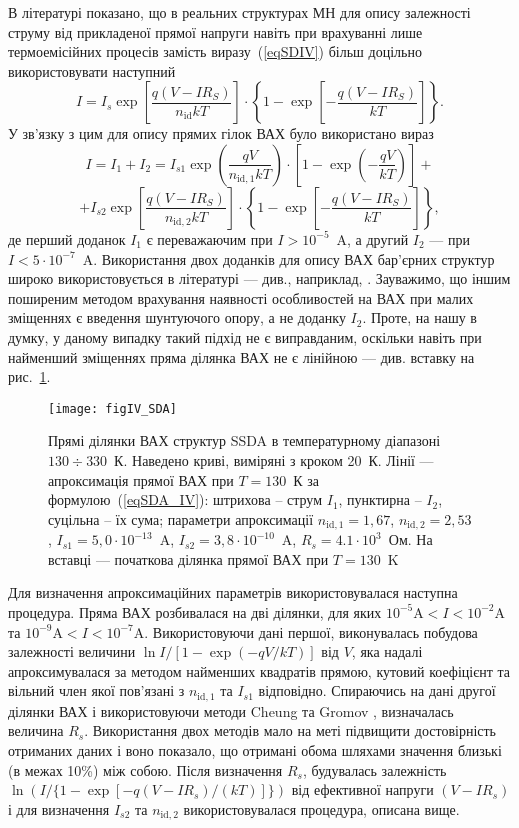 В літературі \cite{Rhoderick1988,Gromov,Sze2012} показано, що в реальних структурах МН для опису залежності струму від прикладеної прямої напруги
навіть при врахуванні лише термоемісійних процесів замість виразу~(\ref{eqSDIV}) більш доцільно використовувати наступний
\begin{equation}
\label{eqSDIV:2}
I=I_s\exp\left[\frac{q(V-IR_S)}{n_\mathrm{id}kT}\right]\cdot
\left\{1-\exp\left[-\frac{q(V-IR_S)}{kT}\right]\right\}.
\end{equation}
У зв'язку з цим для опису прямих гілок ВАХ було використано вираз
\[
I=I_1+I_2=I_{s1}\exp{\left(\frac{qV}{n_{\mathrm{id},1}kT}\right)}\cdot
\left[1-\exp{\left(-\frac{qV}{kT}\right)}\right]+\]
\begin{equation} \label{eqSDA_IV}
+I_{s2}\exp\left[\frac{q(V-IR_S)}{n_{\mathrm{id},2}kT}\right]\cdot
\left\{1-\exp\left[-\frac{q(V-IR_S)}{kT}\right]\right\},
\end{equation}
де перший доданок $I_1$ є переважаючим при $I>10^{-5}$~A, а другий $I_2$ --- при $I<5\cdot10^{-7}$~A.
Використання двох доданків для опису ВАХ бар'єрних структур широко використовується
в літературі --- див., наприклад, \cite{Arslan,Donoval2010,Huang,GELCZUK2014}.
Зауважимо, що іншим поширеним методом врахування наявності особливостей на ВАХ при малих зміщеннях є введення шунтуючого опору, а не доданку $I_2$.
Проте, на нашу в думку, у даному випадку такий підхід не є виправданим, оскільки навіть при найменший зміщеннях пряма ділянка ВАХ не є лінійною --- див. вставку на рис.~\ref{figIV_SDA}.

\begin{figure}
\center
\texttt{[image: figIV\_SDA]}
\caption{\label{figIV_SDA}
Прямі  ділянки ВАХ структур SSDA в температурному діапазоні $130\div330$~К.
Наведено криві, виміряні з кроком 20~К.
Лінії --- апроксимація прямої ВАХ при $T=130$~К за формулою~(\ref{eqSDA_IV}):
штрихова -- струм $I_1$, пунктирна -- $I_2$,
суцільна -- їх сума;
параметри апроксимації $n_{\mathrm{id},1}=1,67$,
$n_{\mathrm{id},2}=2,53$,
$I_{s1}=5,0\cdot10^{-13}$~A,
$I_{s2}=3,8\cdot10^{-10}$~A, $R_{s}=4.1\cdot10^3$~Ом.
На вставці --- початкова ділянка прямої ВАХ при $T=130$~K
}%
\end{figure}

Для визначення апроксимаційних параметрів використовувалася наступна процедура.
Пряма ВАХ розбивалася на дві ділянки,
для яких $10^{-5}\mbox{A}<I<10^{-2}\mbox{A}$ та
$10^{-9}\mbox{A}<I<10^{-7}\mbox{A}$.
Використовуючи дані першої, виконувалась побудова залежності величини $\ln{{I}/{\left[1-\exp\left(-qV/kT\right)\right]}}$ від $V$, яка надалі
апроксимувалася за методом найменших квадратів прямою,
кутовий коефіцієнт та вільний член якої пов'язані з $n_{\mathrm{id},1}$ та $I_{s1}$ відповідно.
Спираючись на дані другої ділянки ВАХ і використовуючи методи Cheung \cite{Cheung} та Gromov \cite{Gromov}, визначалась величина $R_s$.
Використання двох методів мало на меті підвищити достовірність отриманих даних і воно показало, що отримані обома шляхами значення близькі (в межах 10\%) між собою.
Після визначення $R_s$, будувалась залежність $\ln (I /\{1 - \exp[ -q (V - IR_s) / (kT ) ]\})$ від
ефективної напруги $(V-IR_s)$ і для визначення $I_{s2}$ та $n_{\mathrm{id},2}$ використовувалася процедура, описана вище.

